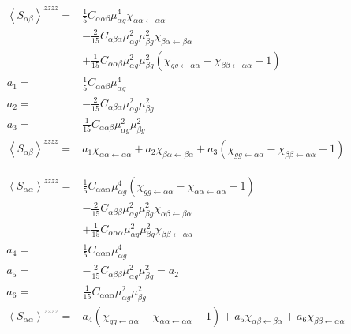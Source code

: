 \begin{align*}
	\left \langle S_{\alpha \beta} \right \rangle^{zzzz} =&  \frac{1}{5}C_{\alpha \alpha \beta} \mu_{\alpha g}^4 \chi_{\alpha \alpha \leftarrow \alpha \alpha} \\
	&- \frac{2}{15}C_{\alpha \beta \alpha} \mu_{\alpha g}^2 \mu_{\beta g}^2 \chi_{\beta \alpha \leftarrow \beta \alpha} \\
	&+\frac{1}{15}C_{\alpha \alpha \beta} \mu_{\alpha g}^2 \mu_{\beta g}^2 \left(  \chi_{g g \leftarrow \alpha \alpha}  -  \chi_{\beta \beta \leftarrow \alpha \alpha} -1 \right) \\
	a_1 =&  \frac{1}{5}C_{\alpha \alpha \beta} \mu_{\alpha g}^4 \\
	a_2 =&  -\frac{2}{15}C_{\alpha \beta \alpha} \mu_{\alpha g}^2 \mu_{\beta g}^2 \\
	a_3 =&  \frac{1}{15}C_{\alpha \alpha \beta} \mu_{\alpha g}^2 \mu_{\beta g}^2 \\
	\left \langle S_{\alpha \beta} \right \rangle^{zzzz} =&  a_1  \chi_{\alpha \alpha \leftarrow \alpha \alpha} + a_2 \chi_{\beta \alpha \leftarrow \beta \alpha} + a_3 \left(  \chi_{g g \leftarrow \alpha \alpha}  -  \chi_{\beta \beta \leftarrow \alpha \alpha} -1 \right)
\end{align*}


\begin{align*}
	\left \langle S_{\alpha \alpha} \right \rangle^{zzzz} =&  \frac{1}{5}C_{\alpha \alpha \alpha} \mu_{\alpha g}^4  \left(  \chi_{g g \leftarrow \alpha \alpha}  -  \chi_{ \alpha \alpha \leftarrow \alpha \alpha} -1 \right) \\
	&- \frac{2}{15}C_{ \alpha \beta \beta} \mu_{\alpha g}^2 \mu_{\beta g}^2 \chi_{\alpha \beta \leftarrow \beta \alpha} \\
	&+ \frac{1}{15}C_{\alpha \alpha \alpha} \mu_{\alpha g}^2 \mu_{\beta g}^2 \chi_{\beta \beta \leftarrow \alpha \alpha} \\
	a_4 =&  \frac{1}{5}C_{\alpha \alpha \alpha} \mu_{\alpha g}^4 \\
	a_5 =&  -\frac{2}{15}C_{ \alpha \beta \beta}  \mu_{\alpha g}^2 \mu_{\beta g}^2  = a_2\\
	a_6 =&  \frac{1}{15}C_{\alpha \alpha \alpha} \mu_{\alpha g}^2 \mu_{\beta g}^2 \\
	\left \langle S_{\alpha \alpha} \right \rangle^{zzzz} =&   a_4 \left(  \chi_{g g \leftarrow \alpha \alpha}  -  \chi_{ \alpha \alpha \leftarrow \alpha \alpha} -1 \right) + a_5 \chi_{\alpha \beta \leftarrow \beta \alpha} + a_6 \chi_{\beta \beta \leftarrow \alpha \alpha}
\end{align*}


